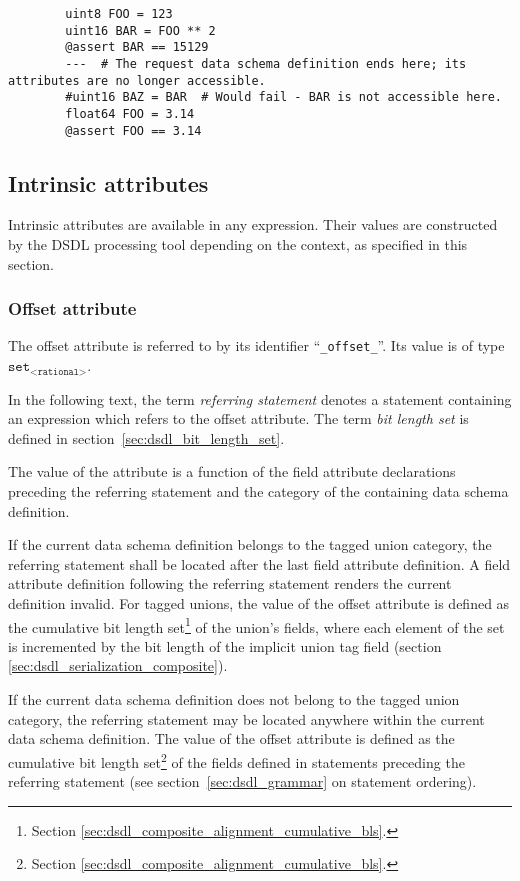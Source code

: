 \begin{remark}
    \begin{verbatim}
        uint8 FOO = 123
        uint16 BAR = FOO ** 2
        @assert BAR == 15129
        ---  # The request data schema definition ends here; its attributes are no longer accessible.
        #uint16 BAZ = BAR  # Would fail - BAR is not accessible here.
        float64 FOO = 3.14
        @assert FOO == 3.14
    \end{verbatim}
\end{remark}

\subsection{Intrinsic attributes}

Intrinsic attributes are available in any expression.
Their values are constructed by the DSDL processing tool depending on the context,
as specified in this section.

\subsubsection{Offset attribute}

The offset attribute is referred to by its identifier ``\verb|_offset_|''.
Its value is of type $\texttt{set}_\texttt{<rational>}$.

In the following text, the term \emph{referring statement} denotes a statement
containing an expression which refers to the offset attribute.
The term \emph{bit length set} is defined in section~\ref{sec:dsdl_bit_length_set}.

The value of the attribute is a function of the field attribute declarations preceding the referring statement
and the category of the containing data schema definition.

If the current data schema definition belongs to the tagged union category,
the referring statement shall be located after the last field attribute definition.
A field attribute definition following the referring statement renders the current definition invalid.
For tagged unions, the value of the offset attribute is defined as the
cumulative bit length set\footnote{Section \ref{sec:dsdl_composite_alignment_cumulative_bls}.}
of the union's fields, where each element of the set is incremented by the bit length of the implicit union tag field
(section \ref{sec:dsdl_serialization_composite}).

If the current data schema definition does not belong to the tagged union category,
the referring statement may be located anywhere within the current data schema definition.
The value of the offset attribute is defined as the
cumulative bit length set\footnote{Section \ref{sec:dsdl_composite_alignment_cumulative_bls}.}
of the fields defined in statements preceding the referring statement
(see section~\ref{sec:dsdl_grammar} on statement ordering).

